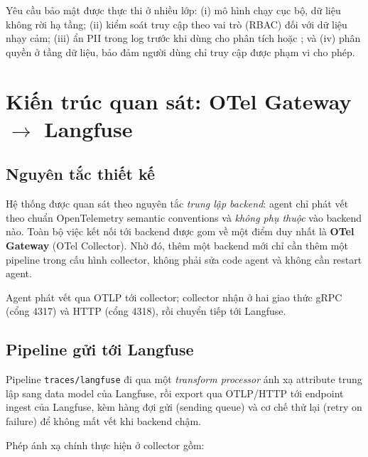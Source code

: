 Yêu cầu bảo mật được thực thi ở nhiều lớp: (i) mô hình chạy cục bộ, dữ liệu không rời hạ
tầng; (ii) kiểm soát truy cập theo vai trò (RBAC) đối với dữ liệu nhạy cảm; (iii) ẩn PII
trong log trước khi dùng cho phân tích hoặc \ft; và (iv) phân quyền ở tầng dữ liệu, bảo
đảm người dùng chỉ truy cập được phạm vi cho phép.

\section{Kiến trúc quan sát: OTel Gateway \texorpdfstring{$\rightarrow$}{->} Langfuse}
\label{sec:otgateway}

\subsection{Nguyên tắc thiết kế}

Hệ thống được quan sát theo nguyên tắc \emph{trung lập backend}: agent chỉ phát vết theo
chuẩn OpenTelemetry semantic conventions và \emph{không phụ thuộc} vào backend nào. Toàn bộ
việc kết nối tới backend được gom về một điểm duy nhất là \textbf{OTel Gateway} (OTel
Collector). Nhờ đó, thêm một backend mới chỉ cần thêm một pipeline trong cấu hình
collector, không phải sửa code agent và không cần restart agent.

Agent phát vết qua OTLP tới collector; collector nhận ở hai giao thức gRPC (cổng 4317) và
HTTP (cổng 4318), rồi chuyển tiếp tới Langfuse.

\subsection{Pipeline gửi tới Langfuse}

Pipeline \texttt{traces/langfuse} đi qua một \emph{transform processor} ánh xạ attribute
trung lập sang data model của Langfuse, rồi export qua OTLP/HTTP tới endpoint ingest của
Langfuse, kèm hàng đợi gửi (sending queue) và cơ chế thử lại (retry on failure) để không
mất vết khi backend chậm.

Phép ánh xạ chính thực hiện ở collector gồm:

